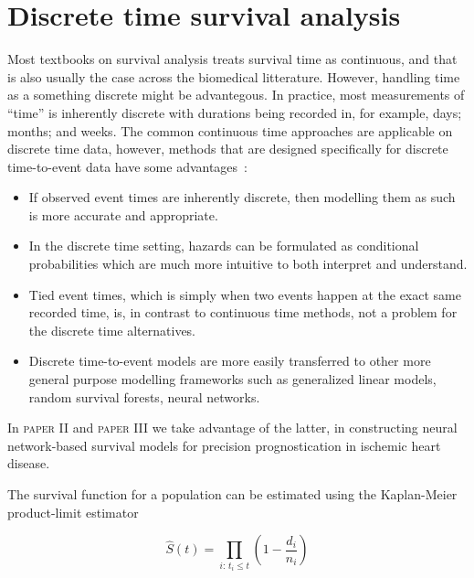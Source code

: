 
\section{Discrete time survival analysis}

Most textbooks on survival analysis treats survival time as continuous, 
and that is also usually the case across the biomedical litterature.
However, handling time as a something discrete might be advantegous.
In practice, most measurements of \enquote{time} is inherently discrete 
with durations being recorded in, for example, days; months; and weeks.
The common continuous time approaches are applicable on discrete time data,
however, methods that are designed specifically for discrete time-to-event 
data have some advantages~\autocite{tutzModeling2016}:

\begin{itemize}
    \item If observed event times are inherently discrete, 
        then modelling them as such is more accurate and appropriate. 
    \item In the discrete time setting, hazards can be formulated as 
        conditional probabilities which are much more intuitive to 
        both interpret and understand.
    \item Tied event times, 
        which is simply when two events happen at the exact same recorded time,
        is, in contrast to continuous time methods,
        not a problem for the discrete time alternatives.
    \item Discrete time-to-event models are more easily transferred to 
        other more general purpose modelling frameworks 
        such as generalized linear models, random survival forests, 
        neural networks.
\end{itemize}

In \textsc{paper II} and \textsc{paper III} we take advantage of the latter,
in constructing neural network-based survival models
for precision prognostication in ischemic heart disease.




The survival function for a population can be estimated using 
the Kaplan-Meier product-limit estimator


\begin{equation}
    \widehat{S} (t) = \prod_{i : \, t_i \leq t} \left(
        1 - \frac{d_i}{n_i}
    \right)
\end{equation}

